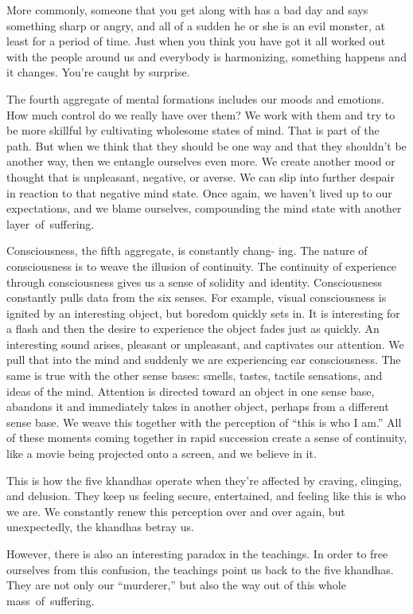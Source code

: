 More commonly, someone that you get along with has a bad day and says something sharp or angry, and all of a sudden he or she is an evil monster, at least for a period of time. Just when you think you have got it all worked out with the people around us and everybody is harmonizing, something happens and it changes. You're caught by surprise.

The fourth aggregate of mental formations includes our moods and emotions. How much control do we really have over them? We work with them and try to be more skillful by cultivating wholesome states of mind. That is part of the path. But when we think that they should be one way and that they shouldn't be another way, then we entangle ourselves even more. We create another mood or thought that is unpleasant, negative, or averse. We can slip into further despair in reaction to that negative mind state. Once again, we haven't lived up to our expectations, and we blame ourselves, compounding the mind state with another \mbox{layer of suffering.}

Consciousness, the fifth aggregate, is constantly chang- \linebreak ing. The nature of consciousness is to weave the illusion of continuity. The continuity of experience through consciousness gives us a sense of solidity and identity. Consciousness constantly pulls data from the six senses. For example, visual consciousness is ignited by an interesting object, but boredom quickly sets in. It is interesting for a flash and then the desire to experience the object fades just as quickly. An interesting sound arises, pleasant or unpleasant, and captivates our attention. We pull that into the mind and suddenly we are experiencing ear consciousness. The same is true with the other sense bases: smells, tastes, tactile sensations, and ideas of the mind. Attention is directed toward an object in one sense base, abandons it and immediately takes in another object, perhaps from a different sense base. We weave this together with the perception of ``this is who I am.'' All of these moments coming together in rapid succession create a sense of continuity, like a movie being projected onto a screen, and we believe in it.

This is how the five khandhas operate when they're affected by craving, clinging, and delusion. They keep us feeling secure, entertained, and feeling like this is who we are. We constantly renew this perception over and over again, but unexpectedly, the khandhas betray us.

However, there is also an interesting paradox in the teachings. In order to free ourselves from this confusion, the teachings point us back to the five khandhas. They are not only our ``murderer,'' but also the way out of this whole \mbox{mass of suffering.}

